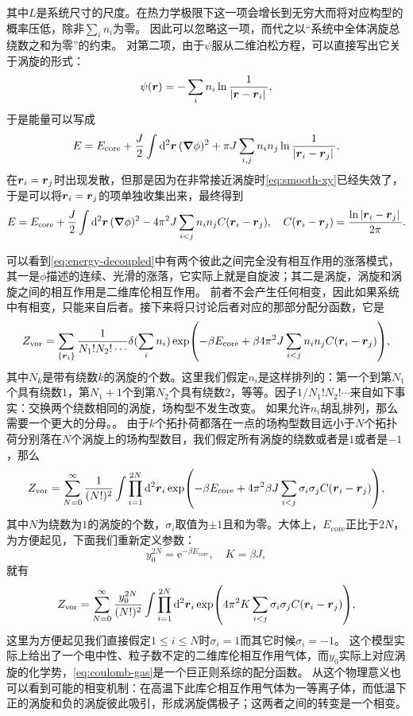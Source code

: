 \documentclass[hyperref, UTF8, a4paper]{ctexart}
\newcommand*{\ee}{\mathrm{e}}
\begin{document}
其中$L$是系统尺寸的尺度。在热力学极限下这一项会增长到无穷大而将对应构型的概率压低，除非$\sum_i n_i$为零。
因此可以忽略这一项，而代之以“系统中全体涡旋总绕数之和为零”的约束。
对第二项，由于$\psi$服从二维泊松方程，可以直接写出它关于涡旋的形式：
\begin{equation}
    \psi(\vb*{r}) = - \sum_i n_i \ln \frac{1}{\abs*{\vb*{r} - \vb*{r}_i}} ,
\end{equation}
于是能量可以写成
\[
    E = E_\text{core} + \frac{J}{2} \int \dd[2]{\vb*{r}} (\grad{\phi})^2 + \pi J \sum_{i, j} n_i n_j \ln \frac{1}{\abs*{\vb*{r}_i - \vb*{r}_j}}.
\]
在$\vb*{r}_i = \vb*{r}_j$时出现发散，但那是因为在非常接近涡旋时\eqref{eq:smooth-xy}已经失效了，于是可以将$\vb*{r}_i = \vb*{r}_j$的项单独收集出来，最终得到
\begin{equation}
    E = E_\text{core} + \frac{J}{2} \int \dd[2]{\vb*{r}} (\grad{\phi})^2 - 4 \pi^2 J \sum_{i < j} n_i n_j C(\vb*{r}_i - \vb*{r}_j), \quad C(\vb*{r}_i - \vb*{r}_j) = \frac{\ln \abs*{\vb*{r}_i - \vb*{r}_j}}{2\pi}. 
    \label{eq:energy-decoupled}
\end{equation}


可以看到\eqref{eq:energy-decoupled}中有两个彼此之间完全没有相互作用的涨落模式，其一是$\phi$描述的连续、光滑的涨落，它实际上就是自旋波；其二是涡旋，涡旋和涡旋之间的相互作用是二维库伦相互作用。
前者不会产生任何相变，因此如果系统中有相变，只能来自后者。接下来将只讨论后者对应的那部分配分函数，它是
\[
    Z_\text{vor} = \sum_{\{\vb*{r}_i\}} \frac{1}{N_1 ! N_2 ! \cdots} \delta(\sum_i n_i) \exp( - \beta E_\text{core} + \beta 4 \pi^2 J \sum_{i < j} n_i n_j C(\vb*{r}_i - \vb*{r}_j)),
\]
其中$N_k$是带有绕数$k$的涡旋的个数。这里我们假定$n_i$是这样排列的：第一个到第$N_1$个具有绕数$1$，第$N_1 + 1$个到第$N_2$个具有绕数$2$，等等。因子$1 / N_1! N_2! \cdots$来自如下事实：交换两个绕数相同的涡旋，场构型不发生改变。
如果允许$n_i$胡乱排列，那么需要一个更大的分母。。
由于$k$个拓扑荷都落在一点的场构型数目远小于$N$个拓扑荷分别落在$N$个涡旋上的场构型数目，我们假定所有涡旋的绕数或者是$1$或者是$-1$，那么 %
\[
    Z_\text{vor} = \sum_{N=0}^\infty \frac{1}{(N!)^2} \int \prod_{i=1}^{2N} \dd[2]{\vb*{r}_i} \exp( - \beta E_\text{core} + 4 \pi^2 \beta J \sum_{i < j} \sigma_i \sigma_j C(\vb*{r}_i - \vb*{r}_j)),
\]
其中$N$为绕数为$1$的涡旋的个数，$\sigma_i$取值为$\pm 1$且和为零。大体上，$E_\text{core}$正比于$2N$，为方便起见，下面我们重新定义参数：
\[
    y_0^{2N} = \ee^{-\beta E_\text{core}}, \quad K = \beta J,
\]
就有
\begin{equation}
    Z_\text{vor} = \sum_{N=0}^\infty \frac{y_0^{2N}}{(N!)^2} \int \prod_{i=1}^{2N} \dd[2]{\vb*{r}_i} \exp(4 \pi^2 K \sum_{i < j} \sigma_i \sigma_j C(\vb*{r}_i - \vb*{r}_j)),
    \label{eq:coulomb-gas}
\end{equation}
这里为方便起见我们直接假定$1 \leq i \leq N$时$\sigma_i=1$而其它时候$\sigma_i=-1$。
这个模型实际上给出了一个电中性、粒子数不定的二维库伦相互作用气体，而$y_0$实际上对应涡旋的化学势，\eqref{eq:coulomb-gas}是一个巨正则系综的配分函数。
从这个物理意义也可以看到可能的相变机制：在高温下此库仑相互作用气体为一等离子体，而低温下正的涡旋和负的涡旋彼此吸引，形成涡旋偶极子；这两者之间的转变是一个相变。
\end{document}
